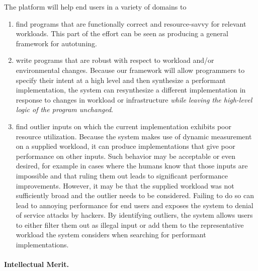 The \rasp{} platform will help end users in a variety of domains to
\begin{enumerate}
\item find programs that are functionally correct and resource-savvy for
  relevant workloads.  This part of the effort can be seen as producing
  a general framework for autotuning.
\item write programs that are robust with respect to workload and/or
  environmental 
  changes.  Because our framework will allow programmers to specify their
  intent at a high level and then synthesize a performant
  implementation, the system can resynthesize a
  different implementation in response to changes in workload or
  infrastructure 
  \textit{while leaving the high-level logic of the program unchanged}.  
\item find outlier inputs on which the current implementation exhibits
  poor resource utilization.  Because the system makes use of dynamic
  measurement on a supplied workload, it can produce implementations
  that give poor performance on other inputs.  Such behavior may be
  acceptable or even desired, for example in cases where the humans know that
  those inputs are impossible and that ruling them out leads to
  significant performance improvements.  However, it may be that the
  supplied workload was not sufficiently broad and the outlier needs
  to be considered.  Failing to do so can lead to annoying performance
  for end users and exposes the system to denial of service attacks
  by hackers.   By identifying outliers, the system allows users to
  either filter them out as illegal input or add them to the
  representative workload the system considers when searching for
  performant implementations.
\end{enumerate}






\paragraph*{Intellectual Merit.}


